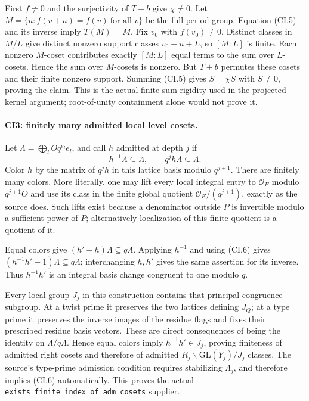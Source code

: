 First $f\ne0$ and the surjectivity of $T+b$ give $\chi\ne0$.
Let $M=\{u:f(v+u)=f(v)\ \text{for all }v\}$ be the full period
group. Equation (CI.5) and its inverse imply $T(M)=M$. Fix
$v_0$ with $f(v_0)\ne0$. Distinct classes in $M/L$ give distinct
nonzero support classes $v_0+u+L$, so $[M:L]$ is finite.
Each nonzero $M$-coset contributes exactly $[M:L]$ equal terms to
the sum over $L$-cosets. Hence the sum over $M$-cosets is nonzero.
But $T+b$ permutes these cosets and their finite nonzero support.
Summing (CI.5) gives $S=\chi S$ with $S\ne0$, proving the claim.
This is the actual finite-sum rigidity used in the projected-kernel
argument; root-of-unity containment alone would not prove it.

\paragraph{CI3: finitely many admitted local level cosets.}
Let $\Lambda=\bigoplus_l Oq^{e_l}e_l$, and call $h$ admitted at
depth $j$ if
\[
 h^{-1}\Lambda\subseteq\Lambda,
 \qquad q^j h\Lambda\subseteq\Lambda.
 \tag{CI.6}
\]
Color $h$ by the matrix of $q^jh$ in this lattice basis modulo
$q^{j+1}$. There are finitely many colors. More literally, one may
lift every local integral entry to $\mathcal O_E$ modulo
$q^{j+1}O$ and use its class in the finite global quotient
$\mathcal O_E/(q^{j+1})$, exactly as the source does. Such lifts
exist because a denominator outside $P$ is invertible modulo a
sufficient power of $P$; alternatively localization of this finite
quotient is a quotient of it.

Equal colors give $(h'-h)\Lambda\subseteq q\Lambda$.
Applying $h^{-1}$ and using (CI.6) gives
$(h^{-1}h'-1)\Lambda\subseteq q\Lambda$; interchanging $h,h'$
gives the same assertion for its inverse. Thus $h^{-1}h'$ is an
integral basis change congruent to one modulo $q$.

Every local group $J_j$ in this construction contains that
principal congruence subgroup. At a twist prime it preserves the
two lattices defining $J_Q$; at a type prime it preserves the
inverse images of the residue flags and fixes their prescribed
residue basis vectors. These are direct consequences of being
the identity on $\Lambda/q\Lambda$. Hence equal colors imply
$h^{-1}h'\in J_j$, proving finiteness of admitted right cosets and
therefore of admitted $R_j\backslash\mathrm{GL}(Y_j)/J_j$
classes. The source's type-prime admission condition requires
stabilizing $\Lambda_j$, and therefore implies (CI.6) automatically.
This proves the actual
\texttt{exists\_finite\_index\_of\_adm\_cosets} supplier.

